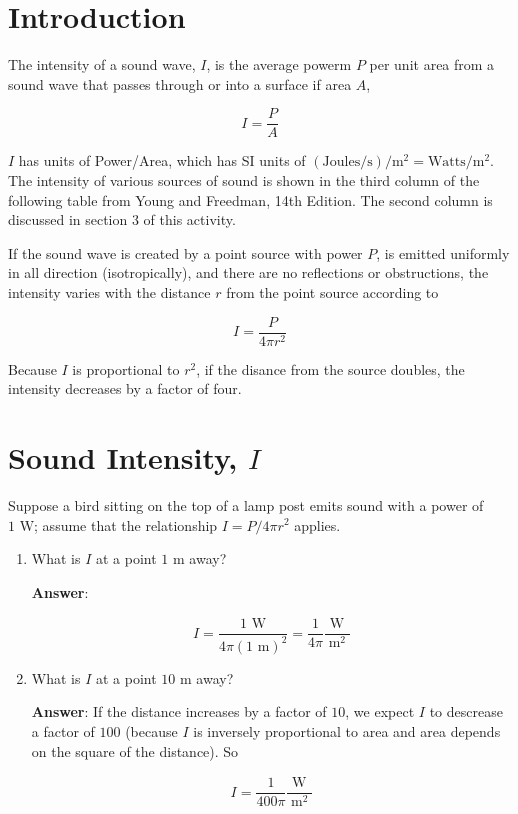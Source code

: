 \documentclass{article}
\begin{document}
\section{Introduction}

The intensity of a sound wave, $I$, is the average powerm $P$ per unit area from a sound wave that passes through or into a surface if area $A$,

$$I = \frac{P}{A}$$

$I$ has units of Power/Area, which has SI units of $(\text{Joules/s})/\text{m}^2=\text{Watts}/\text{m}^2$. The intensity of various sources of sound is shown in the third column of the following table from Young and Freedman, 14th Edition. The second column is discussed in section 3 of this activity.



If the sound wave is created by a point source with power $P$, is emitted uniformly in all direction (isotropically), and there are no reflections or obstructions, the intensity varies with the distance $r$ from the point source according to

$$I = \frac{P}{4\pi r^2}$$

Because $I$ is proportional to $r^2$, if the disance from the source doubles, the intensity decreases by a factor of four.

\newpage

\section{Sound Intensity, $I$}

Suppose a bird sitting on the top of a lamp post emits sound with a power of $1\text{ W}$; assume that the relationship $I = P/4\pi r^2$ applies.

\begin{enumerate}

  \item What is $I$ at a point $1\text{ m}$ away?

        \ifsolutions
        \textbf{Answer}:

        $$I = \frac{1\text{ W}}{4\pi (1\text{ m})^2} = \frac{1}{4\pi} \frac{\text{ W}\phantom{^2}}{\text{m}^2}$$
        \else
        \vskip 120pt
        \fi

  \item What is $I$ at a point $10\text{ m}$ away?

        \ifsolutions
        \textbf{Answer}: If the distance increases by a factor of $10$, we expect $I$ to descrease a factor of $100$ (because $I$ is inversely proportional to area and area depends on the square of the distance). So

        $$I = \frac{1}{400\pi} \frac{\text{ W}\phantom{^2}}{\text{m}^2}$$
        \else
        \vskip 120pt
        \fi

\end{enumerate}
\end{document}
